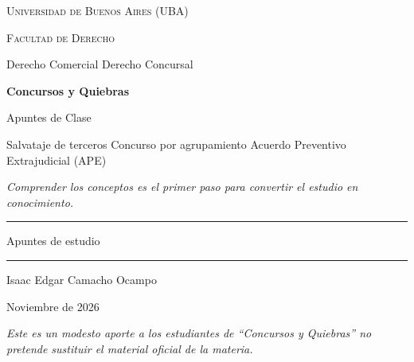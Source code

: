 \documentclass[12pt,oneside]{book}
\newcommand{\universidad}{Universidad de Buenos Aires (UBA)}
\newcommand{\facultad}{Facultad de Derecho}
\newcommand{\carrera}{Derecho Comercial \textperiodcentered{} Derecho Concursal}
\newcommand{\materia}{Concursos y Quiebras}
\newcommand{\subtitulo}{Salvataje de terceros \textperiodcentered{} Concurso por agrupamiento \textperiodcentered{} Acuerdo Preventivo Extrajudicial (APE)}
\newcommand{\autor}{Isaac Edgar Camacho Ocampo}
\newcommand{\anio}{Noviembre de 2026}
\begin{document}

\begin{titlepage}

\thispagestyle{empty}

\begin{center}

\vspace*{1cm}

{\large \textsc{\universidad}}

\vspace{0.2cm}

{\large \textsc{\facultad}}

\vspace{0.2cm}

{\large \carrera}

\vspace{3cm}

{\Huge \textbf{\materia}}

\vspace{1cm}

{\LARGE Apuntes de Clase}

\vspace{0.4cm}

{\large \subtitulo}

\vspace{0.8cm}

\textit{Comprender los conceptos es el primer paso para convertir el estudio en conocimiento.}

\vspace{1.2cm}

\rule{0.70\textwidth}{0.5pt}

\vspace{0.5cm}

{\large Apuntes de estudio}

\vspace{0.5cm}

\rule{0.70\textwidth}{0.5pt}

\vfill

{\large \autor}

\vspace{0.3cm}

{\large \anio}

\end{center}

\vfill

\begin{flushleft}
\textit{Este es un modesto aporte a los estudiantes de ``Concursos y Quiebras'' no pretende sustituir el material oficial de la materia.}
\end{flushleft}

\end{titlepage}
\end{document}
